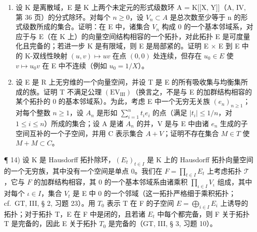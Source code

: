 \begin{enumerate}
\def\labelenumi{\arabic{enumi})}
\setcounter{enumi}{11}
\item
  设 K 是离散域，E 是 K 上两个未定元的形式级数环 A = K{[}{[}X, Y{]}{]}（A, IV, 第 36 页）的分式除环。对每个 \(n \geqslant 0\)，设 \(V_{n} \subset A\) 是总次数至少等于 n 的形式级数所成的集合。证明：在 E 中，诸集合 \(V_{n}\) 构成 0 的一个基本邻域系，对应于与 E（在 K 上）的向量空间结构相容的一个拓扑，对此拓扑 E 是可度量化且完备的；若进一步 K 是有限域，则 E 是局部紧的。证明 E × E 到 E 中的 K-双线性映射 \((u, v) \mapsto uv\) 在点 \((0, 0)\) 处连续，但存在 \(u_{0} \in E\) 使 \(v \mapsto u_{0}v\) 在 E 中不连续（例如 \(u_{0} = 1/X\)）。
\item
  设 E 是 R 上无穷维的一个向量空间，并设 T 是 E 的所有吸收集与均衡集所成的族。证明 T 不满足公理 \((\mathrm{EV}_{\mathrm{III}})\)（换言之，不是与 E 的加群结构相容的某个拓扑的 0 的基本邻域系）。为此，考虑 E 中一个无穷无关族 \((e_{n})_{n\geqslant1}\)；对每个整数 \(n\geqslant1\)，设 \(A_{n}\) 是形如 \(\sum_{i=1}^{n}t_{i}e_{i}\) 的点（满足 \(|t_{i}|\leqslant1/n\)，对 \(1\leqslant i\leqslant n\)）所成的集合；设 A 是诸 \(A_{n}\) 的并，V 是与 E 中由诸 \(e_{n}\) 生成的子空间互补的一个子空间，并用 C 表示集合 \(A+V\)；证明不存在集合 \(M\in T\) 使 \(M+M\subset C\)。
\end{enumerate}

¶ 14) 设 K 是 Hausdorff 拓扑除环，\((E_{t})_{t\in I}\) 是 K 上的 Hausdorff 拓扑向量空间的一个无穷族，其中没有一个空间是单点 0。我们在 \(F = \prod_{t\in I} E_t\) 上考虑拓扑 \(\mathcal{T}\)，它与 \(F\) 的加群结构相容，其 0 的一个基本邻域系由诸乘积 \(\prod_{\iota \in I} V_{\iota}\) 组成，其中对每个 \(\iota \in I\)，集合 \(V_{t}\) 是 E 中 0 的一个邻域（这一拓扑严格细于乘积拓扑；cf.~GT, III, § 2, 习题 23）。用 \(T_{0}\) 表示 T 在 F 的子空间 \(E = \bigoplus_{i \in I} E_{i}\) 上诱导的拓扑；对于拓扑 T，E 在 F 中是闭的，且若诸 \(E_{t}\) 中每个都完备，则 F 关于拓扑 T 是完备的，因此 E 关于拓扑 \(T_{0}\) 是完备的（GT, III, § 3, 习题 10）。

